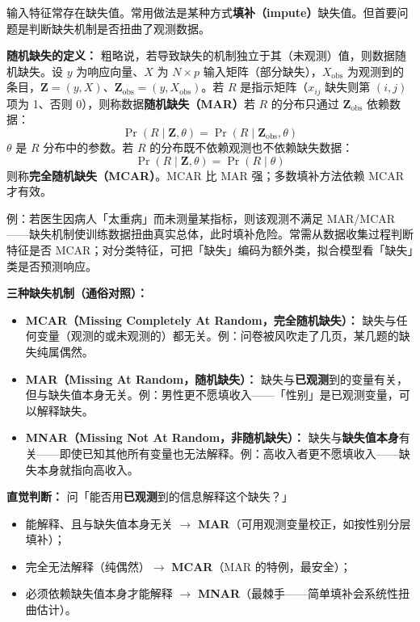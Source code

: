 输入特征常存在缺失值。常用做法是某种方式\textbf{填补（impute）}缺失值。但首要问题是判断缺失机制是否扭曲了观测数据。

\textbf{随机缺失的定义：} 粗略说，若导致缺失的机制独立于其（未观测）值，则数据随机缺失。设 $y$ 为响应向量、$X$ 为 $N \times p$ 输入矩阵（部分缺失），$X_{\mathrm{obs}}$ 为观测到的条目，$\mathbf{Z} = (y, X)$、$\mathbf{Z}_{\mathrm{obs}} = (y, X_{\mathrm{obs}})$。若 $R$ 是指示矩阵（$x_{ij}$ 缺失则第 $(i,j)$ 项为 1、否则 0），则称数据\textbf{随机缺失（MAR）}若 $R$ 的分布只通过 $\mathbf{Z}_{\mathrm{obs}}$ 依赖数据：
\begin{equation}\label{eq:9_31}
    \Pr(R \mid \mathbf{Z}, \theta) = \Pr(R \mid \mathbf{Z}_{\mathrm{obs}}, \theta)
\end{equation}
$\theta$ 是 $R$ 分布中的参数。若 $R$ 的分布既不依赖观测也不依赖缺失数据：
\begin{equation}\label{eq:9_32}
    \Pr(R \mid \mathbf{Z}, \theta) = \Pr(R \mid \theta)
\end{equation}
则称\textbf{完全随机缺失（MCAR）}。MCAR 比 MAR 强；多数填补方法依赖 MCAR 才有效。

例：若医生因病人「太重病」而未测量某指标，则该观测不满足 MAR/MCAR——缺失机制使训练数据扭曲真实总体，此时填补危险。常需从数据收集过程判断特征是否 MCAR；对分类特征，可把「缺失」编码为额外类，拟合模型看「缺失」类是否预测响应。

\textbf{三种缺失机制（通俗对照）：}
\begin{itemize}
    \item \textbf{MCAR（Missing Completely At Random，完全随机缺失）：} 缺失与任何变量（观测的或未观测的）都无关。例：问卷被风吹走了几页，某几题的缺失纯属偶然。
    \item \textbf{MAR（Missing At Random，随机缺失）：} 缺失与\textbf{已观测}到的变量有关，但与缺失值本身无关。例：男性更不愿填收入——「性别」是已观测变量，可以解释缺失。
    \item \textbf{MNAR（Missing Not At Random，非随机缺失）：} 缺失与\textbf{缺失值本身}有关——即使已知其他所有变量也无法解释。例：高收入者更不愿填收入——缺失本身就指向高收入。
\end{itemize}

\textbf{直觉判断：} 问「能否用\textbf{已观测}到的信息解释这个缺失？」
\begin{itemize}
    \item 能解释、且与缺失值本身无关 $\rightarrow$ \textbf{MAR}（可用观测变量校正，如按性别分层填补）；
    \item 完全无法解释（纯偶然）$\rightarrow$ \textbf{MCAR}（MAR 的特例，最安全）；
    \item 必须依赖缺失值本身才能解释 $\rightarrow$ \textbf{MNAR}（最棘手——简单填补会系统性扭曲估计）。
\end{itemize}

